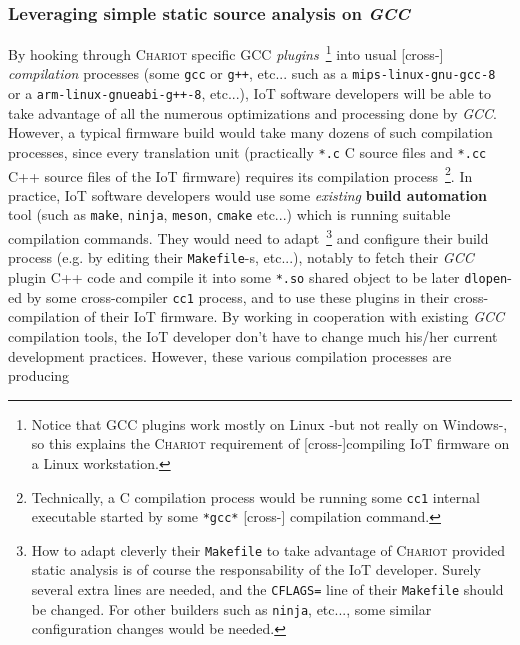\newpage


\subsubsection{Leveraging simple static source analysis on \emph{GCC}}
\label{subsubsec:leveraging-static-analysis}

By hooking through \textsc{Chariot} specific GCC
\emph{plugins}~\footnote{Notice that GCC plugins work mostly on Linux
  -but not really on Windows-, so this explains the \textsc{Chariot}
  requirement of [cross-]compiling IoT firmware on a Linux
  workstation.}  into usual [cross-] \emph{compilation} processes
(some \texttt{gcc} or \texttt{g++}, etc... such as a
\texttt{mips-linux-gnu-gcc-8} or a \texttt{arm-linux-gnueabi-g++-8},
etc...), IoT software developers will be able to take advantage of all
the numerous optimizations and processing done by \emph{GCC}. However,
a typical firmware build would take many dozens of such compilation
processes, since every translation unit (practically \texttt{*.c} C
source files and \texttt{*.cc} C++ source files of the IoT firmware)
requires its compilation process~\footnote{Technically, a C
  compilation process would be running some \texttt{cc1} internal
  executable started by some \texttt{*gcc*} [cross-] compilation
  command.}. In practice, IoT software developers would use some
\emph{existing} \textbf{build automation} tool (such as \texttt{make},
\texttt{ninja}, \texttt{meson}, \texttt{cmake} etc...)   which is running suitable compilation commands. They
would need to adapt~\footnote{How to adapt cleverly their
  \texttt{Makefile} to take advantage of \textsc{Chariot} provided
  static analysis is of course the responsability of the IoT
  developer. Surely several extra lines are needed, and the
  \texttt{CFLAGS=} line of their \texttt{Makefile} should be
  changed. For other builders such as \texttt{ninja}, etc..., some
  similar configuration changes would be needed.}  and configure their
build process (e.g. by editing their \texttt{Makefile}-s, etc...),
notably to fetch their \emph{GCC} plugin C++ code and compile it into
some \texttt{*.so} shared object to be later \texttt{dlopen}-ed by
some cross-compiler \texttt{cc1} process, and to use these plugins in
their cross-compilation of their IoT firmware. By working in
cooperation with existing \emph{GCC} compilation tools, the IoT
developer don't have to change much his/her current development
practices. However, these various compilation processes are producing
